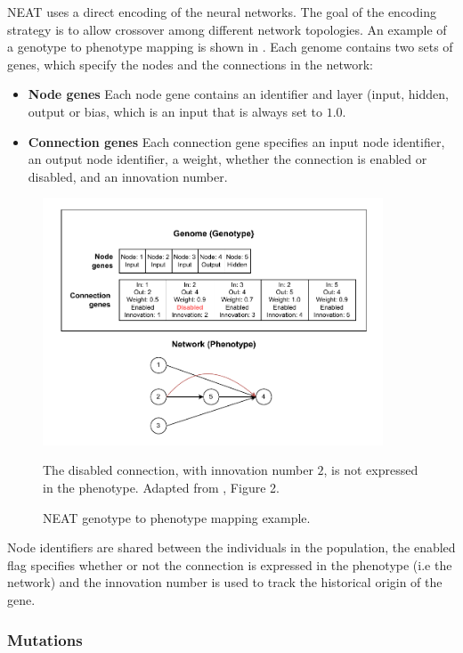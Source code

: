 NEAT uses a direct encoding of the neural networks. The goal of the encoding strategy is to allow crossover among different network topologies.
An example of a genotype to phenotype mapping is shown in .
Each genome contains two sets of genes, which specify the nodes and the connections in the network:

\begin{itemize}
    \item \textbf{Node genes} Each node gene contains an identifier and layer (input, hidden, output or bias, which is an input that is always set to $1.0$.
    \item \textbf{Connection genes} Each connection gene specifies an input node identifier, an output node identifier, a weight, whether the connection is enabled or
        disabled, and an innovation number.
\end{itemize}


\begin{figure}
    \centering
    \includegraphics[width=0.9\textwidth]{Pictures/neat_encoding}
    \caption{NEAT genotype to phenotype mapping example.}{The disabled connection, with innovation number $2$, is not expressed in the phenotype. Adapted from \cite{neat}, Figure 2.}
    \label{fig:neat_genome}
\end{figure}

Node identifiers are shared between the individuals in the population, the enabled flag specifies whether or not the connection is expressed in the phenotype (i.e
the network) and the innovation number is used to track the historical origin of the gene.

\subsubsection{Mutations}

